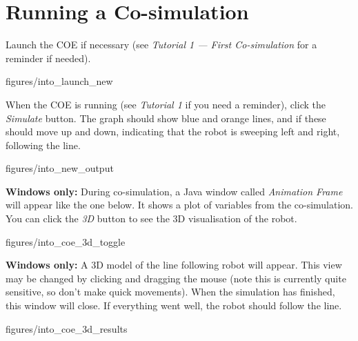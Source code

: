 \documentclass[11pt,a4paper]{../tutorial}
\begin{document}
\section{Running a Co-simulation}

\begin{instructions}

\item Launch the COE if necessary (see \emph{Tutorial 1 --- First Co-simulation} for a reminder if needed).


    \begin{annotation}[width=0.85\linewidth,trim=0 110 0 200,clip]{figures/into_launch_new}
    \end{annotation}

\item When the COE is running (see \emph{Tutorial 1} if you need a reminder), click the \emph{Simulate} button. The graph should show blue and orange lines, and if these should move up and down, indicating that the robot is sweeping left and right, following the line.

    \begin{annotation}[width=0.85\linewidth,trim=0 30 0 35,clip]{figures/into_new_output}
    \end{annotation}

\newpage
\item \textbf{Windows only:} During co-simulation, a Java window called \emph{Animation Frame} will appear like the one below. It shows a plot of variables from the co-simulation. You can click the \emph{3D} button to see the 3D visualisation of the robot.

    \begin{annotation}[width=0.5\linewidth,trim=0 0 0 0,clip]{figures/into_coe_3d_toggle}
    \end{annotation}

\item \textbf{Windows only:} A 3D model of the line following robot will appear. This view may be changed by clicking and dragging the mouse (note this is currently quite sensitive, so don’t make quick movements). When the simulation has finished, this window will close. If everything went well, the robot should follow the line.

    \begin{annotation}[width=0.5\linewidth,trim=0 300 0 0,clip]{figures/into_coe_3d_results}
    \end{annotation}

\end{instructions}
\end{document}
